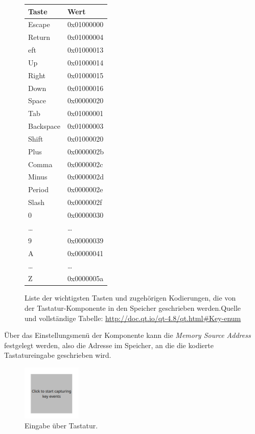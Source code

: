 \begin{figure}
	\centering
	\begin{tabular}{ll}
	\textbf{Taste} & \textbf{Wert} \\
	\hline
	Escape & 0x01000000 \\
	Return & 0x01000004 \\
	eft & 0x01000013 \\
	Up & 0x01000014 \\
	Right & 0x01000015 \\
	Down & 0x01000016 \\
	Space & 0x00000020 \\
	Tab & 0x01000001 \\
	Backspace & 0x01000003 \\
	Shift & 0x01000020 \\
	Plus & 0x0000002b \\
	Comma & 0x0000002c \\
	Minus & 0x0000002d \\
	Period & 0x0000002e \\
	Slash & 0x0000002f \\
	0 & 0x00000030 \\
	\dots & \dots \\
	9 & 0x00000039 \\
	A & 0x00000041 \\
	\dots & \dots \\
	Z & 0x0000005a \\
\end{tabular}
	\caption{Liste der wichtigsten Tasten und zugehörigen Kodierungen, die von der
	Tastatur-Komponente in den Speicher geschrieben werden.\newline Quelle und
	vollständige Tabelle:
	\url{http://doc.qt.io/qt-4.8/qt.html\#Key-enum}}
	\label{tab:keys}
\end{figure}

Über das Einstellungsmenü der Komponente kann die \emph{Memory Source Address}
festgelegt werden, also die Adresse im Speicher, an die die kodierte
Tastatureingabe geschrieben wird.

\begin{figure}[ht]
	\centering
	\includegraphics[width=0.25\textwidth]{Images/Keyboard_inactive}
	\caption{Eingabe über Tastatur.}
	\label{Joystick}
\end{figure}


